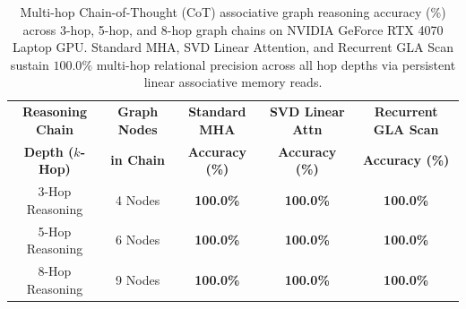 \documentclass[journal]{IEEEtran}
\begin{document}
\begin{table}[t]
\centering
\caption{Multi-hop Chain-of-Thought (CoT) associative graph reasoning accuracy (\%) across 3-hop, 5-hop, and 8-hop graph chains on NVIDIA GeForce RTX 4070 Laptop GPU. Standard MHA, SVD Linear Attention, and Recurrent GLA Scan sustain $100.0\%$ multi-hop relational precision across all hop depths via persistent linear associative memory reads.}
\label{tab:multihop_reasoning}
\small
\begin{tabular}{ccccc}
\toprule
\textbf{Reasoning Chain} & \textbf{Graph Nodes} & \textbf{Standard MHA} & \textbf{SVD Linear Attn} & \textbf{Recurrent GLA Scan} \\
\textbf{Depth ($k$-Hop)} & \textbf{in Chain} & \textbf{Accuracy (\%)} & \textbf{Accuracy (\%)} & \textbf{Accuracy (\%)} \\
\midrule
3-Hop Reasoning & 4 Nodes & \textbf{100.0\%} & \textbf{100.0\%} & \textbf{100.0\%} \\
5-Hop Reasoning & 6 Nodes & \textbf{100.0\%} & \textbf{100.0\%} & \textbf{100.0\%} \\
8-Hop Reasoning & 9 Nodes & \textbf{100.0\%} & \textbf{100.0\%} & \textbf{100.0\%} \\
\bottomrule
\end{tabular}
\end{table}

\end{document}
